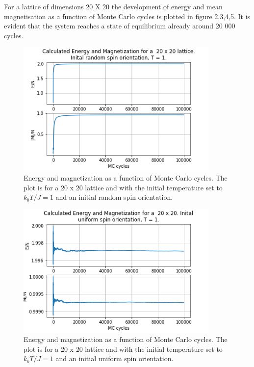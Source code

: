 \documentclass[twoside,twocolumn]{article}
\begin{document}
For a lattice of dimensions 20 X 20 the development of energy and mean magnetisation as a function of Monte Carlo cycles is plotted in figure 2,3,4,5. It is evident that the system reaches a state of  equilibrium already around 20 000 cycles. 

\begin{figure}[h]
  \includegraphics[width= 10cm]{N=20T=1R.png}
  \caption{Energy and magnetization as a function of Monte Carlo cycles. The plot is for a 20 x 20 lattice and with the initial temperature set to $k_bT/J = 1$ and an initial random spin orientation.}
  \label{fig:boat2}
\end{figure}

\begin{figure}[h]
  \includegraphics[width= 10cm]{N=20T=1U.png}
  \caption{Energy and magnetization as a function of Monte Carlo cycles. The plot is for a 20 x 20 lattice and with the initial temperature set to $k_bT/J = 1$ and an initial uniform spin orientation.}
  \label{fig:boat3}
\end{figure}
\end{document}
